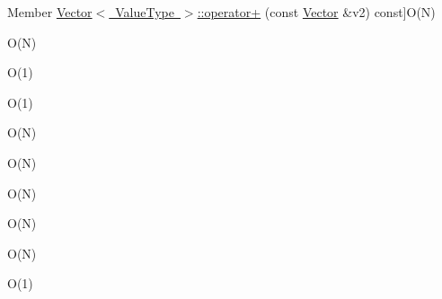 \begin{DoxyRefList}
%
Member \mbox{\hyperlink{classVector_acb70fcd67f846bf16b96223bcf43e476}{Vector$<$ Value\+Type $>$\+:\+:operator+}} (const \mbox{\hyperlink{classVector}{Vector}} \&v2) const]O(\+N)  
\item[\label{BigOh__BigOh000139}%
\Hypertarget{BigOh__BigOh000139}%
Member \mbox{\hyperlink{classVector_a6b35f98e0e64a2fff6891a8806f640fd}{Vector$<$ Value\+Type $>$\+:\+:operator+=}} (const \mbox{\hyperlink{classVector}{Vector}} \&v2)]O(\+N)  
\item[\label{BigOh__BigOh000140}%
\Hypertarget{BigOh__BigOh000140}%
Member \mbox{\hyperlink{classVector_afded71b2a6d6df8b0257cbfd8f7e8d5f}{Vector$<$ Value\+Type $>$\+:\+:operator+=}} (const Value\+Type \&value)]O(1)  
\item[\label{BigOh__BigOh000147}%
\Hypertarget{BigOh__BigOh000147}%
Member \mbox{\hyperlink{classVector_ad2a2f86bb5857209608bbbfe1066c650}{Vector$<$ Value\+Type $>$\+:\+:operator,}} (const Value\+Type \&value)]O(1)  
\item[\label{BigOh__BigOh000143}%
\Hypertarget{BigOh__BigOh000143}%
Member \mbox{\hyperlink{classVector_a77901fd042b59d646be1da79b8339c5c}{Vector$<$ Value\+Type $>$\+:\+:operator$<$}} (const \mbox{\hyperlink{classVector}{Vector}} \&v2) const]O(\+N)  
\item[\label{BigOh__BigOh000144}%
\Hypertarget{BigOh__BigOh000144}%
Member \mbox{\hyperlink{classVector_ae70337b6c4c49dde850031de8b68c05d}{Vector$<$ Value\+Type $>$\+:\+:operator$<$=}} (const \mbox{\hyperlink{classVector}{Vector}} \&v2) const]O(\+N)  
\item[\label{BigOh__BigOh000141}%
\Hypertarget{BigOh__BigOh000141}%
Member \mbox{\hyperlink{classVector_a31eebc4de791cf62b8fa12a0eeca90dc}{Vector$<$ Value\+Type $>$\+:\+:operator==}} (const \mbox{\hyperlink{classVector}{Vector}} \&v2) const]O(\+N)  
\item[\label{BigOh__BigOh000145}%
\Hypertarget{BigOh__BigOh000145}%
Member \mbox{\hyperlink{classVector_a0b8b14442cb420ffaecc0606345e73a1}{Vector$<$ Value\+Type $>$\+:\+:operator$>$}} (const \mbox{\hyperlink{classVector}{Vector}} \&v2) const]O(\+N)  
\item[\label{BigOh__BigOh000146}%
\Hypertarget{BigOh__BigOh000146}%
Member \mbox{\hyperlink{classVector_adaa095641c5fc43f90754d7694784006}{Vector$<$ Value\+Type $>$\+:\+:operator$>$=}} (const \mbox{\hyperlink{classVector}{Vector}} \&v2) const]O(\+N)  
\item[\label{BigOh__BigOh000135}%
\Hypertarget{BigOh__BigOh000135}%
Member \mbox{\hyperlink{classVector_a7dbb3a92c8b6a08a04b564aed136b870}{Vector$<$ Value\+Type $>$\+:\+:operator\mbox{[}\mbox{]}}} (int index)]O(1)  

\end{DoxyRefList}
